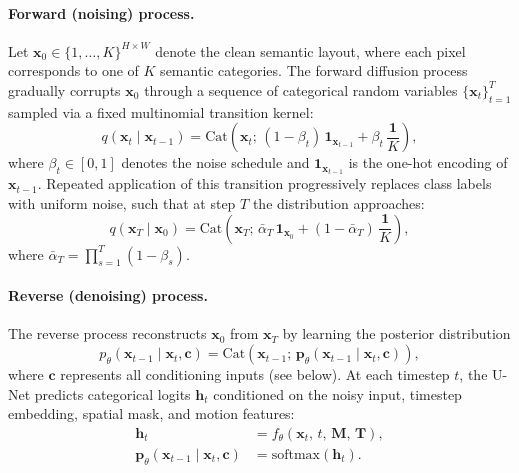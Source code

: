 \documentclass{article}
\begin{document}
\paragraph{Forward (noising) process.}
Let $\mathbf{x}_0 \in \{1,\ldots,K\}^{H\times W}$ denote the clean semantic layout, where each pixel corresponds to one of $K$ semantic categories. The forward diffusion process gradually corrupts $\mathbf{x}_0$ through a sequence of categorical random variables $\{\mathbf{x}_t\}_{t=1}^T$ sampled via a fixed multinomial transition kernel:
\begin{equation}
    q(\mathbf{x}_t \mid \mathbf{x}_{t-1}) = \mathrm{Cat}\!\left(
        \mathbf{x}_t ;\,
        (1 - \beta_t)\,\mathbf{1}_{\mathbf{x}_{t-1}} + \beta_t\,\frac{\mathbf{1}}{K}
    \right),
\end{equation}
where $\beta_t \in [0,1]$ denotes the noise schedule and $\mathbf{1}_{\mathbf{x}_{t-1}}$ is the one-hot encoding of $\mathbf{x}_{t-1}$. Repeated application of this transition progressively replaces class labels with uniform noise, such that at step $T$ the distribution approaches:
\begin{equation}
    q(\mathbf{x}_T \mid \mathbf{x}_0) = \mathrm{Cat}\!\left(
        \mathbf{x}_T;\,
        \bar{\alpha}_T\,\mathbf{1}_{\mathbf{x}_0} + (1 - \bar{\alpha}_T)\,\frac{\mathbf{1}}{K}
    \right),
\end{equation}
where $\bar{\alpha}_T = \prod_{s=1}^T (1 - \beta_s)$.

\paragraph{Reverse (denoising) process.}
The reverse process reconstructs $\mathbf{x}_0$ from $\mathbf{x}_T$ by learning the posterior distribution
\begin{equation}
    p_\theta(\mathbf{x}_{t-1} \mid \mathbf{x}_t, \mathbf{c}) =
    \mathrm{Cat}\!\left(
        \mathbf{x}_{t-1};\, \mathbf{p}_\theta(\mathbf{x}_{t-1} \mid \mathbf{x}_t, \mathbf{c})
    \right),
\end{equation}
where $\mathbf{c}$ represents all conditioning inputs (see below).  
At each timestep $t$, the U-Net predicts categorical logits $\mathbf{h}_t$ conditioned on the noisy input, timestep embedding, spatial mask, and motion features:
\begin{align}
    \mathbf{h}_t &= f_\theta(\mathbf{x}_t,\, t,\, \mathbf{M},\, \mathbf{T}),\\
    \mathbf{p}_\theta(\mathbf{x}_{t-1} \mid \mathbf{x}_t, \mathbf{c}) &= \mathrm{softmax}(\mathbf{h}_t).
\end{align}
\end{document}
